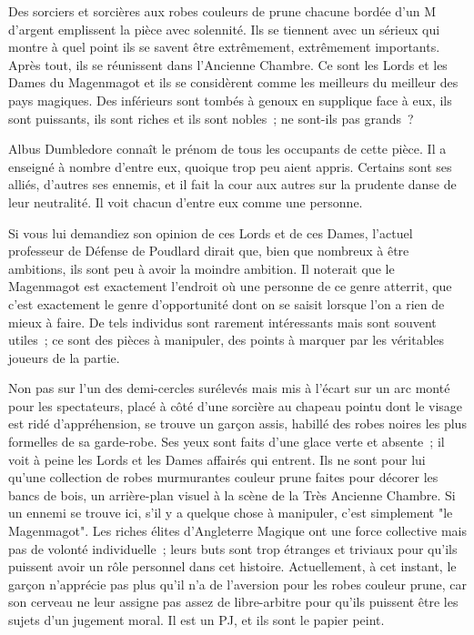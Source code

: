 Des sorciers et sorcières aux robes couleurs de prune chacune bordée d'un M d'argent emplissent la pièce avec solennité. Ils se tiennent avec un sérieux qui montre à quel point ils se savent être extrêmement, extrêmement importants. Après tout, ils se réunissent dans l'Ancienne Chambre. Ce sont les Lords et les Dames du Magenmagot et ils se considèrent comme les meilleurs du meilleur des pays magiques. Des inférieurs sont tombés à genoux en supplique face à eux, ils sont puissants, ils sont riches et ils sont nobles~; ne sont-ils pas grands~?

Albus Dumbledore connaît le prénom de tous les occupants de cette pièce. Il a enseigné à nombre d'entre eux, quoique trop peu aient appris. Certains sont ses alliés, d'autres ses ennemis, et il fait la cour aux autres sur la prudente danse de leur neutralité. Il voit chacun d'entre eux comme une personne.

Si vous lui demandiez son opinion de ces Lords et de ces Dames, l'actuel professeur de Défense de Poudlard dirait que, bien que nombreux à être ambitions, ils sont peu à avoir la moindre ambition. Il noterait que le Magenmagot est exactement l'endroit où une personne de ce genre atterrit, que c'est exactement le genre d'opportunité dont on se saisit lorsque l'on a rien de mieux à faire. De tels individus sont rarement intéressants mais sont souvent utiles~; ce sont des pièces à manipuler, des points à marquer par les véritables joueurs de la partie.

Non pas sur l'un des demi-cercles surélevés mais mis à l'écart sur un arc monté pour les spectateurs, placé à côté d'une sorcière au chapeau pointu dont le visage est ridé d'appréhension, se trouve un garçon assis, habillé des robes noires les plus formelles de sa garde-robe. Ses yeux sont faits d'une glace verte et absente~; il voit à peine les Lords et les Dames affairés qui entrent. Ils ne sont pour lui qu'une collection de robes murmurantes couleur prune faites pour décorer les bancs de bois, un arrière-plan visuel à la scène de la Très Ancienne Chambre. Si un ennemi se trouve ici, s'il y a quelque chose à manipuler, c'est simplement "le Magenmagot". Les riches élites d'Angleterre Magique ont une force collective mais pas de volonté individuelle~; leurs buts sont trop étranges et triviaux pour qu'ils puissent avoir un rôle personnel dans cet histoire. Actuellement, à cet instant, le garçon n'apprécie pas plus qu'il n'a de l'aversion pour les robes couleur prune, car son cerveau ne leur assigne pas assez de libre-arbitre pour qu'ils puissent être les sujets d'un jugement moral. Il est un PJ\footnotemark{}, et ils sont le papier peint.

